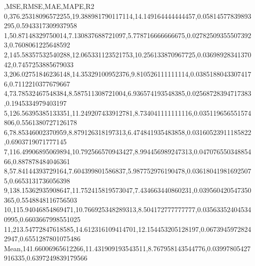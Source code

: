 ,MSE,RMSE,MAE,MAPE,R2
0,376.25318096572255,19.388981790117114,14.149164444444457,0.05814577839893295,0.5943317309937958
1,50.87148329750014,7.130837688721097,5.778716666666675,0.027825093555073923,0.7608061225648592
2,145.58357532540288,12.065331123521753,10.256133870967725,0.0369892834137042,0.7457253885679033
3,206.02751846236148,14.35329100952376,9.810526111111114,0.03851880433074176,0.7112210377679667
4,73.78532467548384,8.587511308721004,6.936574193548385,0.02568728394717383,0.1945334979403197
5,126.56395385133351,11.249207433912781,8.734041111111116,0.035119656551574806,0.5561380727126178
6,78.85346002370959,8.879126318197313,6.474841935483858,0.03160523911185822,0.6903719071777145
7,116.49906895069894,10.792566570943427,8.994456989247313,0.04707655034885466,0.887878484046361
8,57.84144393729164,7.604399801586837,5.987752976190478,0.036180419816925075,0.6653131736056398
9,138.15362935908647,11.752415819573047,7.434663440860231,0.039560420547350365,0.5548848116756503
10,115.94046854869471,10.766925348289313,8.504172777777777,0.035633524045340995,0.6603667998551025
11,213.54772847618585,14.612316109414701,12.154453205128197,0.06739459728242947,0.6551287801075486
Mean,141.66006965612266,11.431909193543511,8.767958143544776,0.03997805427916335,0.6397249839179566
